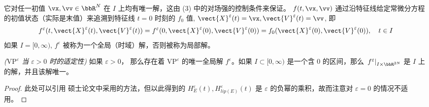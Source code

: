\begin{definition}
\begin{enumerate}[(1)]
        它对任一初值 $\vx,\vv\in\bbR^N$ 在 $I$ 上均有唯一解，这由 (3) 中的对场强的控制条件来保证。 $f(t,\vx, \vv)$ 通过沿特征线给定常微分方程的初值状态（实际是末值）来追溯到特征线 $t=0$ 时刻的 $f_0$ 值, $\vect{X}^\varepsilon(t)= \vx, \vect{V}^\varepsilon(t)= \vv$, 即
        \[
        f^{\varepsilon}(t, \vect{X}^\varepsilon(t), \vect{V}^\varepsilon(t))=f^{\varepsilon}(0, \vect{X}^\varepsilon(0), \vect{V}^\varepsilon(0))=f_{0}(\vect{X}^\varepsilon(0), \vect{V}^\varepsilon(0)), \quad t \in I
        \]
        如果 $I=[0, \infty)$, $f^{\varepsilon}$ 被称为一个全局（时域）解，否则被称为局部解。
    \end{enumerate}

\end{definition}






\begin{theorem}\textit{($\text{VP}^\varepsilon$ 当 $\varepsilon>0$ 时的适定性)}
\label{thm:epsilon-greater-0}
如果 $\varepsilon>0$， 那么存在着 $\text{VP}^{\varepsilon}$ 的唯一全局解 $f^\varepsilon$。如果 $I\subset[0, \infty)$ 是一个含 $0$ 的区间，那么 $\left.f^{\varepsilon}\right|_{I \times \bbR^{2N}}$ 是 $I$ 上的解，并且该解唯一。
\end{theorem} 
\begin{proof}
    此处可以引用 \cite*{Horst1975}  硕士论文中采用的方法，但以此得到的 $H_E^\varepsilon(t),H_{lip(E)}^\varepsilon(t)$ 是 $\varepsilon$ 的负幂的乘积，故而注意对 $\varepsilon=0$ 的情况不适用。
\end{proof}


